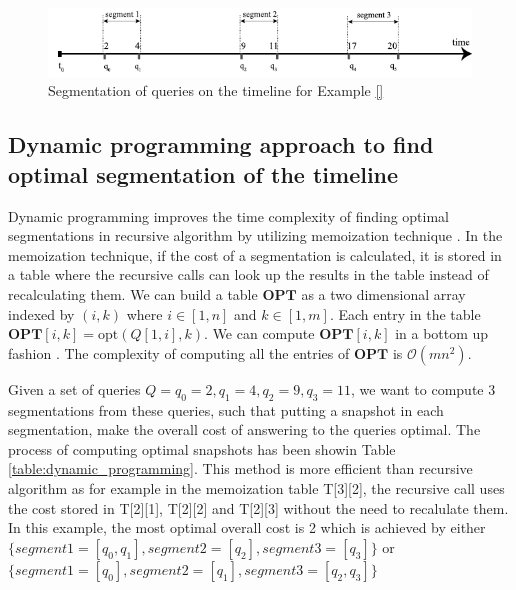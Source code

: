 			\begin{figure}
				\centering
				\includegraphics[width=\textwidth]{figs/example_recursive_s.pdf}
				\caption{Segmentation of queries on the timeline for Example \ref{}}
				\label{fig:example_recursive_segmentation}
			\end{figure}


		\subsection{Dynamic programming approach to find optimal segmentation of the timeline} \label{sec:dynamic_programming_optimal_segment}

			Dynamic programming improves the time complexity of finding optimal segmentations in recursive algorithm by utilizing memoization technique \cite{johnsonbaugh2003algorithms}. In the memoization technique, if the cost of a segmentation is calculated, it is stored in a table where the recursive calls can look up the results in the table instead of recalculating them. We can build a table $\mathbf{OPT}$ as a two dimensional array
			indexed by $(i, k)$ where $i\in [1, n]$ and $k\in [1, m]$.  Each entry
			in the table $\mathbf{OPT}[i,k] = \mathrm{opt}(Q[1,i], k)$.
			We can compute $\mathbf{OPT}[i,k]$ in a bottom up fashion \cite{kossmann2000iterative}.
			The complexity of computing all the entries of $\mathbf{OPT}$ is $\mathcal{O}(mn^2)$.

			\begin{example}
				Given a set of queries $Q={q_0=2,q_1=4,q_2=9,q_3=11}$, we want to compute 3 segmentations from these queries, such that putting a snapshot in each segmentation, make the overall cost of answering to the queries optimal. The process of computing optimal snapshots has been showin Table \ref{table:dynamic_programming}. This method is more efficient than recursive algorithm as for example in the memoization table T[3][2], the recursive call uses the cost stored in T[2][1], T[2][2] and T[2][3] without the need to recalulate them. In this example, the most optimal overall cost is 2 which is achieved by either $\{segment1 =[q_0,q_1],segment2=[q_2],segment3=[q_3]\}$ or $\{segment1 =[q_0], segment2 = [q_1], segment3 = [q_2, q_3]\}$
			\label{example:dynamic_programming}
			\end{example}

